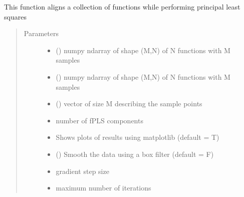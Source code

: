 \documentclass[letterpaper,10pt,english]{sphinxmanual}
\begin{document}
\begin{fulllineitems}
\label{\detokenize{time_warping:time_warping.align_fPLS}}
This function aligns a collection of functions while performing
principal least squares
\begin{quote}\begin{description}
\item[{Parameters}] \leavevmode\begin{itemize}
\item {} 
 () \textendash{} numpy ndarray of shape (M,N) of N functions with M samples

\item {} 
 () \textendash{} numpy ndarray of shape (M,N) of N functions with M samples

\item {} 
 () \textendash{} vector of size M describing the sample points

\item {} 
 \textendash{} number of fPLS components

\item {} 
 \textendash{} Shows plots of results using matplotlib (default = T)

\item {} 
 () \textendash{} Smooth the data using a box filter (default = F)

\item {} 
 \textendash{} gradient step size

\item {} 
 \textendash{} maximum number of iterations

\end{itemize}


\end{description}
\end{quote}
\end{fulllineitems}
\end{document}
